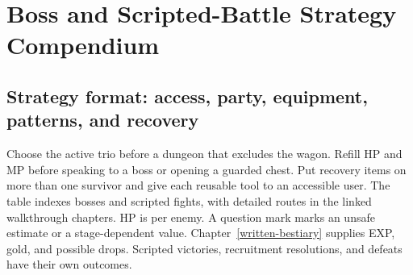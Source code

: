 \chapter{Boss and Scripted-Battle Strategy Compendium}
\label{written-bosses}

\section{Strategy format: access, party, equipment, patterns, and recovery}
Choose the active trio before a dungeon that excludes the wagon. Refill HP and MP before speaking to a boss or opening a guarded chest. Put recovery items on more than one survivor and give each reusable tool to an accessible user. The table indexes bosses and scripted fights, with detailed routes in the linked walkthrough chapters. HP is per enemy. A question mark marks an unsafe estimate or a stage-dependent value. Chapter~\ref{written-bestiary} supplies EXP, gold, and possible drops. Scripted victories, recruitment resolutions, and defeats have their own outcomes.

